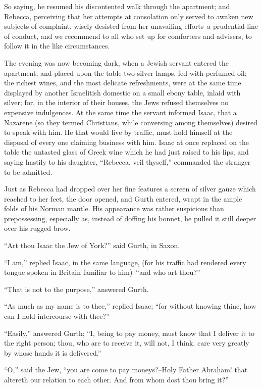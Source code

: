 So saying, he resumed his discontented walk through the apartment; and
Rebecca, perceiving that her attempts at consolation only served to
awaken new subjects of complaint, wisely desisted from her unavailing
efforts--a prudential line of conduct, and we recommend to all who set
up for comforters and advisers, to follow it in the like circumstances.

The evening was now becoming dark, when a Jewish servant entered the
apartment, and placed upon the table two silver lamps, fed with perfumed
oil; the richest wines, and the most delicate refreshments, were at the
same time displayed by another Israelitish domestic on a small ebony
table, inlaid with silver; for, in the interior of their houses, the
Jews refused themselves no expensive indulgences. At the same time the
servant informed Isaac, that a Nazarene (so they termed Christians,
while conversing among themselves) desired to speak with him. He that
would live by traffic, must hold himself at the disposal of every one
claiming business with him. Isaac at once replaced on the table the
untasted glass of Greek wine which he had just raised to his lips, and
saying hastily to his daughter, ``Rebecca, veil thyself,'' commanded the
stranger to be admitted.

Just as Rebecca had dropped over her fine features a screen of silver
gauze which reached to her feet, the door opened, and Gurth entered,
wrapt in the ample folds of his Norman mantle. His appearance was rather
suspicious than prepossessing, especially as, instead of doffing his
bonnet, he pulled it still deeper over his rugged brow.

``Art thou Isaac the Jew of York?'' said Gurth, in Saxon.

``I am,'' replied Isaac, in the same language, (for his traffic had
rendered every tongue spoken in Britain familiar to him)--``and who art
thou?''

``That is not to the purpose,'' answered Gurth.

``As much as my name is to thee,'' replied Isaac; ``for without knowing
thine, how can I hold intercourse with thee?''

``Easily,'' answered Gurth; ``I, being to pay money, must know that I
deliver it to the right person; thou, who are to receive it, will not, I
think, care very greatly by whose hands it is delivered.''

``O,'' said the Jew, ``you are come to pay moneys?--Holy Father Abraham!
that altereth our relation to each other. And from whom dost thou bring
it?''

